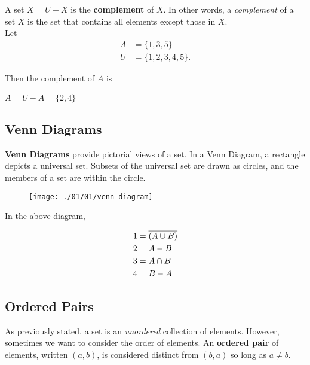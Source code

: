 A set $\overline{X} = U - X$ is the \textbf{complement} of $X$.  In other words, a \textit{complement} of a set $X$ is the set that contains all elements except those in $X$.\\

Let
\begin{align*}
    A &= \{1, 3, 5\}\\
    U &= \{1, 2, 3, 4, 5\}.
\end{align*}

Then the complement of $A$ is

\begin{center}
    $\overline{A} = U - A = \{2, 4\}$
\end{center}

\subsection*{Venn Diagrams}

\textbf{Venn Diagrams} provide pictorial views of a set.  In a Venn Diagram, a rectangle depicts a universal set.  Subsets of the universal set are drawn as circles, and the members of a set are within the circle.

\begin{figure}[h]
\texttt{[image: ./01/01/venn-diagram]}
\centering
\end{figure}

In the above diagram,

\begin{align*}
    1 &= \overline{(A \cup B)}\\
    2 &= A - B\\
    3 &= A \cap B\\
    4 &= B - A\\
\end{align*}

\clearpage

\subsection*{Ordered Pairs}

As previously stated, a set is an \textit{unordered} collection of elements.  However, sometimes we want to consider the order of elements.  An \textbf{ordered pair} of elements, written $(a, b)$, is considered distinct from $(b, a)$ so long as $a \neq b$.  

